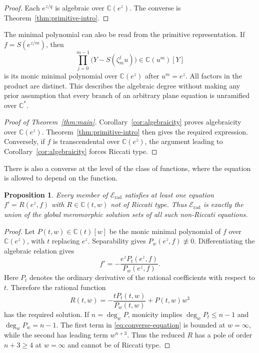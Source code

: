 \documentclass[11pt,reqno]{amsart}
\numberwithin{equation}{section}
\newtheorem{proposition}[theorem]{Proposition}
\theoremstyle{definition}
\theoremstyle{remark}
\newcommand{\C}{\mathbb C}
\newcommand{\Erad}{\mathscr E_{\mathrm{rad}}}
\begin{document}
\begin{proof}
Each $e^{z/q}$ is algebraic over $\C(e^z)$. The converse is
Theorem~\ref{thm:primitive-intro}.
\end{proof}

The minimal polynomial can also be read from the primitive
representation. If $f=S(e^{z/m})$, then
\begin{equation}
 \prod_{j=0}^{m-1}\bigl(Y-S(\zeta_m^j u)\bigr)
 \in\C(u^m)[Y]
 \label{eq:orbit-polynomial}
\end{equation}
is its monic minimal polynomial over $\C(e^z)$ after $u^m=e^z$.
All factors in the product are distinct. This describes the
algebraic degree without making any prior assumption that every
branch of an arbitrary plane equation is unramified over $\C^*$.

\begin{proof}[Proof of Theorem~\ref{thm:main}]
Corollary~\ref{cor:algebraicity} proves algebraicity over $\C(e^z)$.
Theorem~\ref{thm:primitive-intro} then gives the required expression.
Conversely, if $f$ is transcendental over $\C(e^z)$, the argument
leading to Corollary~\ref{cor:algebraicity} forces Riccati type.
\end{proof}

There is also a converse at the level of the class of functions,
where the equation is allowed to depend on the function.

\begin{proposition}
\label{prop:converse}
Every member of $\Erad$ satisfies at least one equation
$f'=R(e^z,f)$ with $R\in\C(t,w)$ not of Riccati type. Thus
$\Erad$ is exactly the union of the global meromorphic solution
sets of all such non-Riccati equations.
\end{proposition}

\begin{proof}
Let $P(t,w)\in\C(t)[w]$ be the monic minimal polynomial of $f$
over $\C(e^z)$, with $t$ replacing $e^z$. Separability gives
$P_w(e^z,f)\not\equiv0$. Differentiating the algebraic relation
gives
\[
 f'=-\frac{e^z P_t(e^z,f)}{P_w(e^z,f)}.
\]
Here $P_t$ denotes the ordinary derivative of the rational
coefficients with respect to $t$. Therefore the rational function
\begin{equation}
 R(t,w)=-\frac{tP_t(t,w)}{P_w(t,w)}+P(t,w)w^3
 \label{eq:converse-equation}
\end{equation}
has the required solution. If $n=\deg_w P$, monicity implies
$\deg_w P_t\leq n-1$ and $\deg_w P_w=n-1$. The first term in
\eqref{eq:converse-equation} is bounded at $w=\infty$, while the
second has leading term $w^{n+3}$. Thus the reduced $R$ has a pole
of order $n+3\geq4$ at $w=\infty$ and cannot be of Riccati type.
\end{proof}
\end{document}
